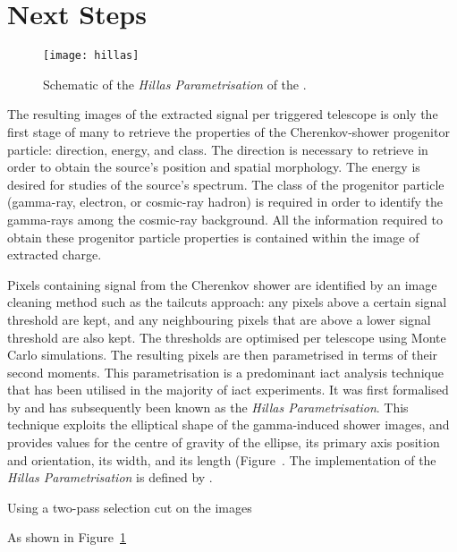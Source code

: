 \section{Next Steps}

\begin{figure}
	\centering
    \texttt{[image: hillas]} 
	\caption[Hillas Parametrisation Schematic.]{Schematic of the \textit{Hillas Parametrisation} of the .}
	\label{fig:hillas}
\end{figure}

The resulting images of the extracted signal per triggered telescope is only the first stage of many to retrieve the properties of the Cherenkov-shower progenitor particle: direction, energy, and class. The direction is necessary to retrieve in order to obtain the source's position and spatial morphology. The energy is desired for studies of the source's spectrum. The class of the progenitor particle (gamma-ray, electron, or cosmic-ray hadron) is required in order to identify the gamma-rays among the cosmic-ray background. All the information required to obtain these progenitor particle properties is contained within the image of extracted charge.

Pixels containing signal from the Cherenkov shower are identified by an image cleaning method such as the tailcuts approach: any pixels above a certain signal threshold are kept, and any neighbouring pixels that are above a lower signal threshold are also kept. The thresholds are optimised per telescope using Monte Carlo simulations. The resulting pixels are then parametrised in terms of their second moments. This parametrisation is a predominant \gls{iact} analysis technique that has been utilised in the majority of \gls{iact} experiments. It was first formalised by \textcite{Hillas1985a} and has subsequently been known as the \textit{Hillas Parametrisation}. This technique exploits the elliptical shape of the gamma-induced shower images, and provides values for the centre of gravity of the ellipse, its primary axis position and orientation, its width, and its length (Figure~. The  implementation of the \textit{Hillas Parametrisation} is defined by \textcite{Reynolds1993}.

Using a two-pass selection cut on the images

As shown in Figure~\ref{}



